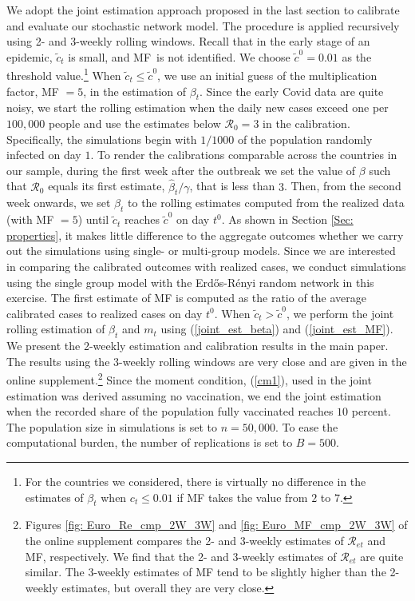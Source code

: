 \documentclass[12pt]{article}
\begin{document}
We adopt the joint estimation approach proposed in the last section to
calibrate and evaluate our stochastic network model. The procedure is applied
recursively using 2- and 3-weekly rolling windows. Recall that in the early
stage of an epidemic, $\tilde{c}_{t}$ is small, and MF\ is not identified. We
choose $\tilde{c}^{0}=0.01$ as the threshold value.\footnote{For the countries
we considered, there is virtually no difference in the estimates of $\beta
_{t}$ when $c_{t}\leq0.01$ if MF takes the value from $2$ to $7$.} When
$\tilde{c}_{t}\leq\tilde{c}^{0}$, we use an initial guess of the
multiplication factor, MF $=5$, in the estimation of $\beta_{t}$. Since the
early Covid data are quite noisy, we start the rolling estimation when the
daily new cases exceed one per $100,000$ people and use the estimates below
$\mathcal{R}_{0}=3$ in the calibration. Specifically, the simulations begin
with $1/1000$ of the population randomly infected on day $1$. To render the
calibrations comparable across the countries in our sample, during the first
week after the outbreak we set the value of $\beta$ such that $\mathcal{R}%
_{0}$ equals its first estimate, $\hat{\beta}_{t}/\gamma$, that is less than
$3$. Then, from the second week onwards, we set $\beta_{t}$ to the rolling
estimates computed from the realized data (with MF $=5$) until $\tilde{c}_{t}$
reaches $\tilde{c}^{0}$ on day $t^{0}$. As shown in Section
\ref{Sec: properties}, it makes little difference to the aggregate outcomes
whether we carry out the simulations using single- or multi-group models.
Since we are interested in comparing the calibrated outcomes with realized
cases, we conduct simulations using the single group model with the
Erd\H{o}s-R\'{e}nyi random network in this exercise. The first estimate of MF
is computed as the ratio of the average calibrated cases to realized cases on
day $t^{0}$. When $\tilde{c}_{t}>\tilde{c}^{0}$, we perform the joint rolling
estimation of $\beta_{t}$ and $m_{t}$ using (\ref{joint_est_beta}) and
(\ref{joint_est_MF}). We present the 2-weekly estimation and calibration
results in the main paper. The results using the 3-weekly rolling windows are
very close and are given in the online supplement.\footnote{Figures
\ref{fig: Euro_Re_cmp_2W_3W} and \ref{fig: Euro_MF_cmp_2W_3W} of the online
supplement compares the 2- and 3-weekly estimates of $\mathcal{R}_{et}$ and
MF, respectively. We find that the 2- and 3-weekly estimates of $\mathcal{R}%
_{et}$ are quite similar. The 3-weekly estimates of MF tend to be slightly
higher than the 2-weekly estimates, but overall they are very close.} Since
the moment condition, (\ref{cm1}), used in the joint estimation was derived
assuming no vaccination, we end the joint estimation when the recorded share
of the population fully vaccinated reaches $10$ percent. The population size
in simulations is set to $n=50,000$. To ease the computational burden, the
number of replications is set to $B=500$.%
\end{document}
